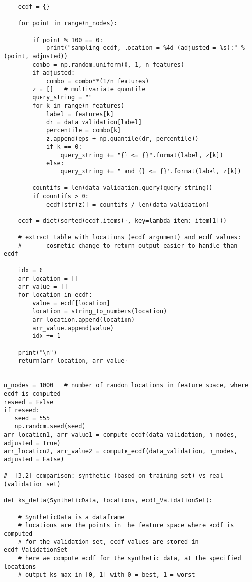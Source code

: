 \documentclass[oneside,10pt]{book}
\begin{document}
\begin{lstlisting}
    ecdf = {} 

    for point in range(n_nodes):

        if point % 100 == 0:
            print("sampling ecdf, location = %4d (adjusted = %s):" % (point, adjusted))
        combo = np.random.uniform(0, 1, n_features)
        if adjusted:
            combo = combo**(1/n_features)
        z = []   # multivariate quantile
        query_string = ""
        for k in range(n_features):
            label = features[k]
            dr = data_validation[label]
            percentile = combo[k] 
            z.append(eps + np.quantile(dr, percentile))
            if k == 0:
                query_string += "{} <= {}".format(label, z[k])
            else: 
                query_string += " and {} <= {}".format(label, z[k])

        countifs = len(data_validation.query(query_string))
        if countifs > 0: 
            ecdf[str(z)] = countifs / len(data_validation)
  
    ecdf = dict(sorted(ecdf.items(), key=lambda item: item[1]))

    # extract table with locations (ecdf argument) and ecdf values:
    #     - cosmetic change to return output easier to handle than ecdf 

    idx = 0
    arr_location = []
    arr_value = []
    for location in ecdf:
        value = ecdf[location]
        location = string_to_numbers(location)
        arr_location.append(location)
        arr_value.append(value)
        idx += 1

    print("\n")
    return(arr_location, arr_value)


n_nodes = 1000   # number of random locations in feature space, where ecdf is computed
reseed = False
if reseed:
   seed = 555
   np.random.seed(seed) 
arr_location1, arr_value1 = compute_ecdf(data_validation, n_nodes, adjusted = True)
arr_location2, arr_value2 = compute_ecdf(data_validation, n_nodes, adjusted = False)

#- [3.2] comparison: synthetic (based on training set) vs real (validation set)

def ks_delta(SyntheticData, locations, ecdf_ValidationSet):

    # SyntheticData is a dataframe
    # locations are the points in the feature space where ecdf is computed
    # for the validation set, ecdf values are stored in ecdf_ValidationSet
    # here we compute ecdf for the synthetic data, at the specified locations
    # output ks_max in [0, 1] with 0 = best, 1 = worst


\end{lstlisting}
\end{document}
